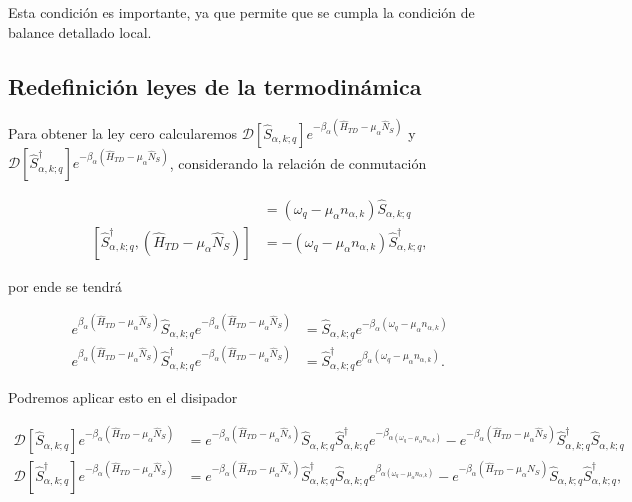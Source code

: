 \begin{appendixs}
Esta condición es importante, ya que permite que se cumpla la condición de balance detallado local. 

\label{apendixKMS}


\newpage

\subsection{Redefinición leyes de la termodinámica}
Para obtener la ley cero calcularemos $\mathcal{D}[\hat{S}_{\alpha,k;q}]e^{-\beta_{\alpha}(\hat{H}_{TD} - \mu_{\alpha}\hat{N}_{S})}$ y $\mathcal{D}[\hat{S}^{\dagger}_{\alpha,k;q}]e^{-\beta_{\alpha}(\hat{H}_{TD} - \mu_{\alpha}\hat{N}_{S})}$, considerando la relación de conmutación

\begin{align*}
    [\hat{S}_{\alpha,k;q},(\hat{H}_{TD} - \mu_{\alpha}\hat{N}_{S})] & = (\omega_{q} - \mu_{\alpha}n_{\alpha,k})\hat{S}_{\alpha,k;q}  \\
    [\hat{S}^{\dagger}_{\alpha,k;q},(\hat{H}_{TD} - \mu_{\alpha}\hat{N}_{S})] & = -(\omega_{q} - \mu_{\alpha}n_{\alpha,k})\hat{S}^{\dagger}_{\alpha,k;q},
\end{align*}

 por ende se tendrá

 \begin{align*}
    e^{\beta_{\alpha}(\hat{H}_{TD} - \mu_{\alpha}\hat{N}_{S})}\hat{S}_{\alpha,k;q} e^{-\beta_{\alpha}(\hat{H}_{TD} - \mu_{\alpha}\hat{N}_{S})} & = \hat{S}_{\alpha,k;q}e^{-\beta_{\alpha}(\omega_{q} - \mu_{\alpha}n_{\alpha,k})} \\
    e^{\beta_{\alpha}(\hat{H}_{TD} - \mu_{\alpha}\hat{N}_{S})}\hat{S}^{\dagger}_{\alpha,k;q} e^{-\beta_{\alpha}(\hat{H}_{TD} - \mu_{\alpha}\hat{N}_{S})} & = \hat{S}^{\dagger}_{\alpha,k;q}e^{\beta_{\alpha}(\omega_{q} - \mu_{\alpha}n_{\alpha,k})}.
 \end{align*}

Podremos aplicar esto en el disipador

\begin{align*}
    \mathcal{D}[\hat{S}_{\alpha,k;q}]e^{-\beta_{\alpha}(\hat{H}_{TD} - \mu_{\alpha}\hat{N}_{S})} & =  e^{-\beta_{\alpha}(\hat{H}_{TD} - \mu_{\alpha}\hat{N}_{s})} \hat{S}_{\alpha,k;q}\hat{S}^{\dagger}_{\alpha,k;q} e^{-\beta_{\alpha(\omega_{q} - \mu_{\alpha}n_{\alpha,k})}} - e^{-\beta_{\alpha}(\hat{H}_{TD} - \mu_{\alpha}\hat{N}_{S})} \hat{S}^{\dagger}_{\alpha,k;q}\hat{S}_{\alpha,k;q} \\
    \mathcal{D}[\hat{S}^{\dagger}_{\alpha,k;q}]e^{-\beta_{\alpha}(\hat{H}_{TD} - \mu_{\alpha}\hat{N}_{S})} & = e^{-\beta_{\alpha}(\hat{H}_{TD} - \mu_{\alpha}\hat{N}_{s})} \hat{S}^{\dagger}_{\alpha,k;q}\hat{S}_{\alpha,k;q} e^{\beta_{\alpha(\omega_{q} - \mu_{\alpha}n_{\alpha,k})}} - e^{-\beta_{\alpha}(\hat{H}_{TD} - \mu_{\alpha}\hat{N}_{S})} \hat{S}_{\alpha,k;q}\hat{S}^{\dagger}_{\alpha,k;q}, 
\end{align*}


\end{appendixs}

